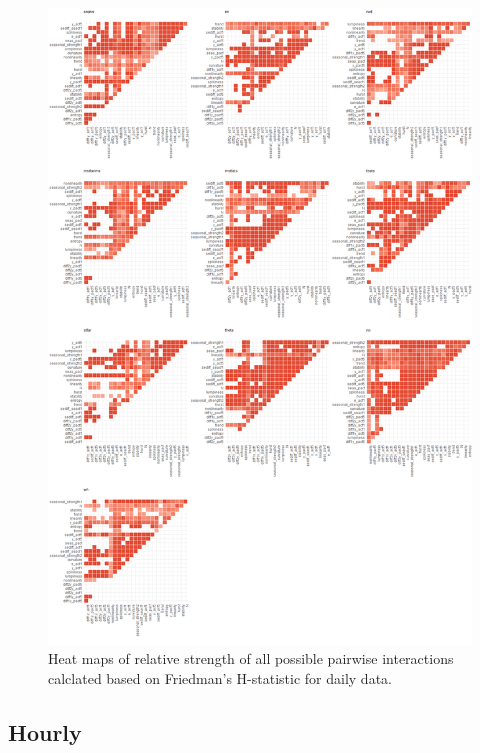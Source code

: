 \documentclass[11pt,a4paper,]{article}
\theoremstyle{definition}
\theoremstyle{definition}
\theoremstyle{definition}
\theoremstyle{remark}
\begin{document}
\begin{figure}
\centering
\includegraphics{figures/friedmandaily-1.png}
\caption{\label{fig:friedmandaily}Heat maps of relative strength of all
possible pairwise interactions calclated based on Friedman's H-statistic
for daily data.}
\end{figure}

\subsection{Hourly}\label{hourly}
\end{document}

